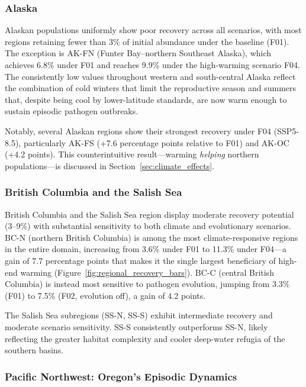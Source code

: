 \subsubsection{Alaska}

Alaskan populations uniformly show poor recovery across all scenarios,
with most regions retaining fewer than 3\% of initial abundance under
the baseline (F01).  The exception is AK-FN (Funter Bay--northern
Southeast Alaska), which achieves 6.8\% under F01 and reaches 9.9\%
under the high-warming scenario F04.  The consistently low values
throughout western and south-central Alaska reflect the combination of
cold winters that limit the reproductive season and summers that,
despite being cool by lower-latitude standards, are now warm enough to
sustain episodic pathogen outbreaks.

Notably, several Alaskan regions show their strongest recovery under
F04 (SSP5-8.5), particularly AK-FS (+7.6 percentage points relative to
F01) and AK-OC (+4.2 points).  This counterintuitive result---warming
\textit{helping} northern populations---is discussed in
Section~\ref{sec:climate_effects}.

\subsubsection{British Columbia and the Salish Sea}

British Columbia and the Salish Sea region display moderate recovery
potential (3--9\%) with substantial sensitivity to both climate and
evolutionary scenarios.  BC-N (northern British Columbia) is among the
most climate-responsive regions in the entire domain, increasing from
3.6\% under F01 to 11.3\% under F04---a gain of 7.7 percentage
points that makes it the single largest beneficiary of high-end warming
(Figure~\ref{fig:regional_recovery_bars}).  BC-C (central British
Columbia) is instead most sensitive to pathogen evolution, jumping from
3.3\% (F01) to 7.5\% (F02, evolution off), a gain of 4.2 points.

The Salish Sea subregions (SS-N, SS-S) exhibit intermediate recovery
and moderate scenario sensitivity.  SS-S consistently outperforms SS-N,
likely reflecting the greater habitat complexity and cooler deep-water
refugia of the southern basins.

\subsubsection{Pacific Northwest: Oregon's Episodic Dynamics}

